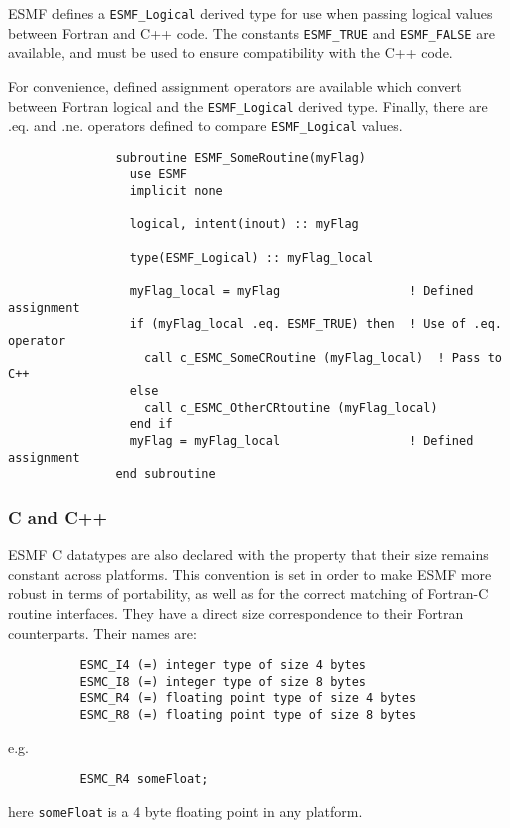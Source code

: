 ESMF defines a {\tt ESMF\_Logical} derived type for use when passing logical values between Fortran and C++ code.  The constants {\tt ESMF\_TRUE} and
{\tt ESMF\_FALSE} are available, and must be used to ensure compatibility with the C++ code.

For convenience, defined assignment operators are available which convert between Fortran logical and the {\tt ESMF\_Logical} derived type. 
Finally, there are .eq. and .ne. operators defined to compare {\tt ESMF\_Logical} values.

\begin{verbatim}
               subroutine ESMF_SomeRoutine(myFlag)
                 use ESMF
                 implicit none
		 
                 logical, intent(inout) :: myFlag
	       
                 type(ESMF_Logical) :: myFlag_local

                 myFlag_local = myFlag                  ! Defined assignment
                 if (myFlag_local .eq. ESMF_TRUE) then  ! Use of .eq. operator
                   call c_ESMC_SomeCRoutine (myFlag_local)  ! Pass to C++
                 else
                   call c_ESMC_OtherCRtoutine (myFlag_local)
                 end if
                 myFlag = myFlag_local                  ! Defined assignment
               end subroutine
\end{verbatim}

\subsubsection{C and C++}

ESMF C datatypes are also declared with the property that their size remains constant across platforms. This convention is set in order to make ESMF more robust in terms of portability, as well as for the correct matching of Fortran-C routine interfaces. They have a direct size correspondence to their Fortran counterparts. Their names are:

\begin{verbatim}   
          ESMC_I4 (=) integer type of size 4 bytes
          ESMC_I8 (=) integer type of size 8 bytes
          ESMC_R4 (=) floating point type of size 4 bytes
          ESMC_R8 (=) floating point type of size 8 bytes
\end{verbatim}

e.g.
\begin{verbatim}
          ESMC_R4 someFloat;
\end{verbatim}
here {\tt someFloat} is a 4 byte floating point in any platform.

